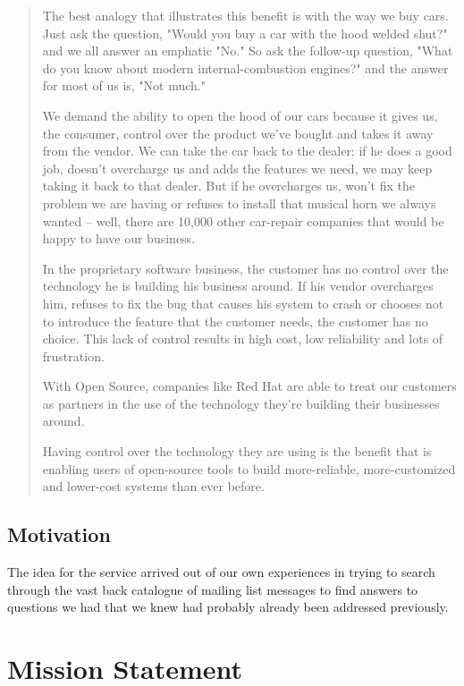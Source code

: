 \begin{quote}
  The best analogy that illustrates this benefit is with the way we
  buy cars. Just ask the question, "Would you buy a car with the hood
  welded shut?" and we all answer an emphatic "No." So ask the
  follow-up question, "What do you know about modern
  internal-combustion engines?"  and the answer for most of us is,
  "Not much."
  
  We demand the ability to open the hood of our cars because it gives
  us, the consumer, control over the product we've bought and takes it
  away from the vendor.  We can take the car back to the dealer; if he
  does a good job, doesn't overcharge us and adds the features we
  need, we may keep taking it back to that dealer. But if he
  overcharges us, won't fix the problem we are having or refuses to
  install that musical horn we always wanted -- well, there are 10,000
  other car-repair companies that would be happy to have our business.
  
  In the proprietary software business, the customer has no control
  over the technology he is building his business around. If his
  vendor overcharges him, refuses to fix the bug that causes his
  system to crash or chooses not to introduce the feature that the
  customer needs, the customer has no choice. This lack of control
  results in high cost, low reliability and lots of frustration.
  
  With Open Source, companies like Red Hat are able to treat our
  customers as partners in the use of the technology they're building
  their businesses around.
  
  Having control over the technology they are using is the benefit
  that is enabling users of open-source tools to build more-reliable,
  more-customized and lower-cost systems than ever before.

\end{quote}

\subsection{Motivation}
The idea for the service arrived out of our own experiences in trying to
search through the vast back catalogue of mailing list messages to find
answers to questions we had that we knew had probably already been
addressed previously.

\section{Mission Statement} 


